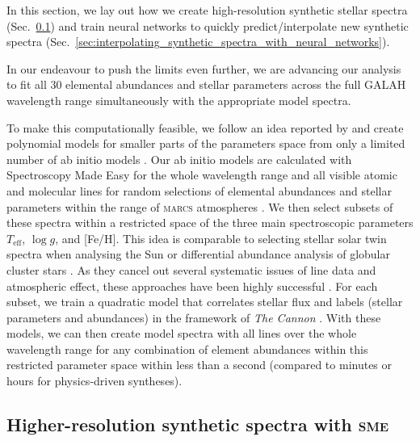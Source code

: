 \documentclass[
  journal=pasa,
  manuscript=research-paper, %
  year=2021,
  volume=37
]{cup-journal}
\newcommand{\Teff}{$T_\mathrm{eff}$\xspace}
\newcommand{\logg}{$\log g$\xspace}
\newcommand{\sme}{\textsc{sme}\xspace}
\begin{document}
In this section, we lay out how we create high-resolution synthetic stellar spectra (Sec.~\ref{sec:higher_resolution_synthetic_spectra}) and train neural networks to quickly predict/interpolate new synthetic spectra (Sec.~\ref{sec:interpolating_synthetic_spectra_with_neural_networks}).

In our endeavour to push the limits even further, we are advancing our analysis to fit all 30 elemental abundances and stellar parameters across the full GALAH wavelength range simultaneously with the appropriate model spectra.

To make this computationally feasible, we follow an idea reported by \citet{Rix2016} and create polynomial models for smaller parts of the parameters space from only a limited number of ab initio models \citep[see also][]{Ting2016b}. Our ab initio models are calculated with Spectroscopy Made Easy \citep[\textsc{sme}][]{Valenti1996,Piskunov2017} for the whole wavelength range and all visible atomic and molecular lines for random selections of elemental abundances and stellar parameters within the range of \textsc{marcs} atmospheres \citep{Gustafsson2008}. We then select subsets of these spectra within a restricted space of the three main spectroscopic parameters \Teff, \logg, and [Fe/H]. This idea is comparable to selecting stellar solar twin spectra when analysing the Sun \citep[see e.g.]{Nissen2015} or differential abundance analysis of globular cluster stars \citep[e.g.][and Monty et al. in prep]{Yong2013}. As they cancel out several systematic issues of line data and atmospheric effect, these approaches have been highly successful \citep{Nissen2018}. For each subset, we train a quadratic model that correlates stellar flux and labels (stellar parameters and abundances) in the framework of \textit{The Cannon} \citep{Ness2015, Casey2016}. With these models, we can then create model spectra with all lines over the whole wavelength range for any combination of element abundances within this restricted parameter space within less than a second (compared to minutes or hours for physics-driven syntheses). 

\subsection{Higher-resolution synthetic spectra with \sme}
\label{sec:higher_resolution_synthetic_spectra}
\end{document}
